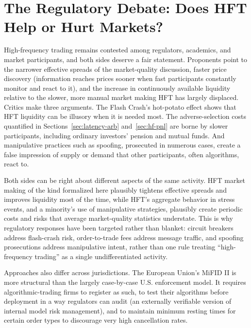 \documentclass[../ai_in_finance]{subfiles}
\begin{document}
\section{The Regulatory Debate: Does HFT Help or Hurt Markets?}

High-frequency trading remains contested among regulators, academics, and market participants, and both sides deserve a fair statement. Proponents point to the narrower effective spreads of the market-quality discussion, faster price discovery (information reaches prices sooner when fast participants constantly monitor and react to it), and the increase in continuously available liquidity relative to the slower, more manual market making HFT has largely displaced. Critics make three arguments. The Flash Crash's hot-potato effect shows that HFT liquidity can be illusory when it is needed most. The adverse-selection costs quantified in Sections~\ref{sec:latency-arb} and~\ref{sec:hf-pnl} are borne by slower participants, including ordinary investors' pension and mutual funds. And manipulative practices such as spoofing, prosecuted in numerous cases, create a false impression of supply or demand that other participants, often algorithms, react to.

Both sides can be right about different aspects of the same activity. HFT market making of the kind formalized here plausibly tightens effective spreads and improves liquidity most of the time, while HFT's aggregate behavior in stress events, and a minority's use of manipulative strategies, plausibly create periodic costs and risks that average market-quality statistics understate. This is why regulatory responses have been targeted rather than blanket: circuit breakers address flash-crash risk, order-to-trade fees address message traffic, and spoofing prosecutions address manipulative intent, rather than one rule treating ``high-frequency trading'' as a single undifferentiated activity.

Approaches also differ across jurisdictions. The European Union's MiFID II is more structural than the largely case-by-case U.S. enforcement model. It requires algorithmic-trading firms to register as such, to test their algorithms before deployment in a way regulators can audit (an externally verifiable version of internal model risk management), and to maintain minimum resting times for certain order types to discourage very high cancellation rates.
\end{document}
